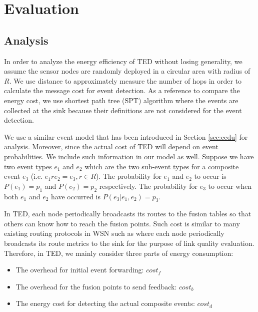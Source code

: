 \section{Evaluation}
\label{sec:ceduevaluation}
\begin{comment}
In this section, we evaluate the performance of TED through analysis, simulation and experiments.
\end{comment}
\subsection{Analysis}
\label{sec:ceduanalysis}
In order to analyze the energy efficiency of TED without losing generality, we assume the sensor nodes are randomly deployed in a circular area with radius of \(R\). We use distance to approximately measure the number of hops in order to calculate the message cost for event detection. As a reference to compare the energy cost, we use shortest path tree (SPT) algorithm where the events are collected at the sink because their definitions are not considered for the event detection.

We use a similar event model that has been introduced in Section \ref{sec:cedu} for analysis. Moreover, since the actual cost of TED will depend on event probabilities. We include such information in our model as well. Suppose we have two event types \(e_1\) and \(e_2\) which are the two sub-event types for a composite event \(e_3\) (i.e. \(e_1re_2=e_3, r\in R\)). The probability for \(e_1\) and \(e_2\) to occur is \(P(e_1)=p_1\) and \(P(e_2)=p_2\) respectively. The probability for \(e_3\) to occur when both \(e_1\) and \(e_2\) have occurred is \(P(e_3|e_1, e_2)=p_3\).

In TED, each node periodically broadcasts its routes to the fusion tables so that others can know how to reach the fusion points. Such cost is similar to many existing routing protocols in WSN such as \cite{rssiroute} where each node periodically broadcasts its route metrics to the sink for the purpose of link quality evaluation. Therefore, in TED, we mainly consider three parts of energy consumption:
\begin{itemize}
\item The overhead for initial event forwarding: \(cost_f\)
\item The overhead for the fusion points to send feedback: \(cost_b\)
\item The energy cost for detecting the actual composite events: \(cost_d\)
\end{itemize}

